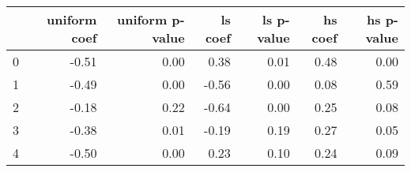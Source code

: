 \begin{tabular}{lrrrrrr}
\toprule
 & uniform coef & uniform p-value & ls coef & ls p-value & hs coef & hs p-value \\
\midrule
0 & -0.51 & 0.00 & 0.38 & 0.01 & 0.48 & 0.00 \\
1 & -0.49 & 0.00 & -0.56 & 0.00 & 0.08 & 0.59 \\
2 & -0.18 & 0.22 & -0.64 & 0.00 & 0.25 & 0.08 \\
3 & -0.38 & 0.01 & -0.19 & 0.19 & 0.27 & 0.05 \\
4 & -0.50 & 0.00 & 0.23 & 0.10 & 0.24 & 0.09 \\
\bottomrule
\end{tabular}
